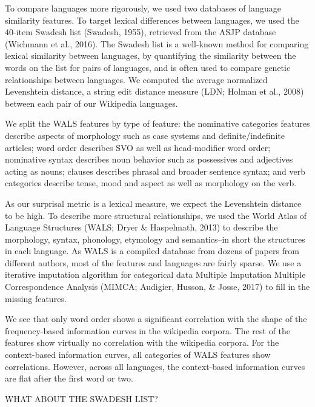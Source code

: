 \documentclass[10pt, letterpaper]{article}
\begin{document}
To compare languages more rigorously, we used two databases of language
similarity features. To target lexical differences between languages, we
used the \(40\)-item Swadesh list (Swadesh, 1955), retrieved from the
ASJP database (Wichmann et al., 2016). The Swadesh list is a well-known
method for comparing lexical similarity between languages, by
quantifying the similarity between the words on the list for pairs of
languages, and is often used to compare genetic relationships between
languages. We computed the average normalized Levenshtein distance, a
string edit distance measure (LDN; Holman et al., 2008) between each
pair of our Wikipedia languages.

We split the WALS features by type of feature: the nominative categories
features describe aspects of morphology such as case systems and
definite/indefinite articles; word order describes SVO as well as
head-modifier word order; nominative syntax describes noun behavior such
as possessives and adjectives acting as nouns; clauses describes phrasal
and broader sentence syntax; and verb categories describe tense, mood
and aspect as well as morphology on the verb.

As our surprisal metric is a lexical measure, we expect the Levenshtein
distance to be high. To describe more structural relationships, we used
the World Atlas of Language Structures (WALS; Dryer \& Haspelmath, 2013)
to describe the morphology, syntax, phonology, etymology and
semantics--in short the structures in each language. As WALS is a
compiled database from dozens of papers from different authors, most of
the features and languages are fairly sparse. We use a iterative
imputation algorithm for categorical data Multiple Imputation Multiple
Correspondence Analysis (MIMCA; Audigier, Husson, \& Josse, 2017) to
fill in the missing features.

We see that only word order shows a significant correlation with the
shape of the frequency-based information curves in the wikipedia
corpora. The rest of the features show virtually no correlation with the
wikipedia corpora. For the context-based information curves, all
categories of WALS features show correlations. However, across all
languages, the context-based information curves are flat after the first
word or two.

WHAT ABOUT THE SWADESH LIST?
\end{document}
